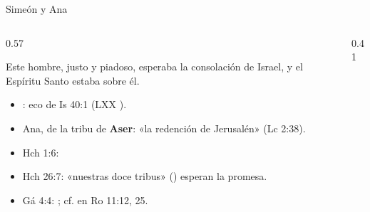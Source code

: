 \begin{frame}{Simeón y Ana}
\begin{columns}[c,onlytextwidth]
\begin{column}{0.57\textwidth}
\begin{cita}Este hombre, justo y piadoso, esperaba la consolación de Israel, y el Espíritu Santo estaba sobre él.\end{cita}
\scriptsize
\begin{itemize}
\item {}: eco de Is 40:1 (LXX ).
\item Ana, de la tribu de \textbf{Aser}: «la redención de Jerusalén» (Lc 2:38).
\item Hch 1:6: 
\item Hch 26:7: «nuestras doce tribus» () esperan la promesa.
\item Gá 4:4: ; cf.  en Ro 11:12, 25.
\end{itemize}
\end{column}
\begin{column}{0.41\textwidth}\end{column}
\end{columns}
\end{frame}

